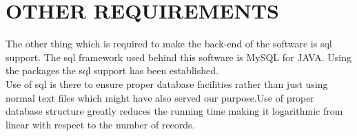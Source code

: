 \documentclass{article}
\begin{document}
\section{OTHER REQUIREMENTS}
The other thing which is required to make the back-end of the software is sql support. The sql framework used behind this software is MySQL for JAVA. Using the packages the sql support has been established.\\
Use of sql is there to ensure proper database facilities rather than just using normal text files which might have also served our purpose.Use of proper database structure greatly reduces the running time making it logarithmic from linear with respect to the number of records.
\\
\end{document}
